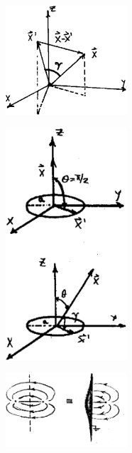 \documentclass[10pt,oneside]{CBFT_book}
\begin{document}
\begin{figure}[htb]
	\begin{center}
	\includegraphics[width=0.4\textwidth]{images/fig_ft1_expansiones1.pdf}	 
	\end{center}
	\caption{}
\end{figure} 

\begin{figure}[htb]
	\begin{center}
	\includegraphics[width=0.4\textwidth]{images/fig_ft1_expansiones2.pdf}	 
	\end{center}
	\caption{}
\end{figure} 

\begin{figure}[htb]
	\begin{center}
	\includegraphics[width=0.4\textwidth]{images/fig_ft1_expansiones3.pdf}	 
	\end{center}
	\caption{}
\end{figure} 
\end{document}
